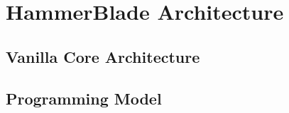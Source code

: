
\section{HammerBlade Architecture} \label{sec:hbarch}
\subsection{Vanilla Core Architecture}
\subsection{Programming Model}